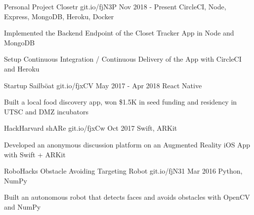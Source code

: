 \begin{cventries}
\cventry
    {Personal Project}
    {Closetr}
    {git.io/fjN3P}
    {Nov 2018 - Present}
    {CircleCI, Node, Express, MongoDB, Heroku, Docker}
    {
      \begin{cvitems}
        \item{Implemented the Backend Endpoint of the Closet Tracker App in Node and MongoDB}
        \item{Setup Continuous Integration / Continuous Delivery of the App with CircleCI and Heroku}
      \end{cvitems}
    }
\cventry
  {Startup}
  {Sailböat}
  {git.io/fjxCV}
  {May 2017 - Apr 2018}
  {React Native}
  {
    \begin{cvitems}
      \item {Built a local food discovery app, won \$1.5K in seed funding and residency in UTSC and DMZ incubators}
    \end{cvitems}
  }
\cventry
  {HackHarvard}
  {shARe}
  {git.io/fjxCw}
  {Oct 2017}
  {Swift, ARKit}
  {
    \begin{cvitems}
      \item {Developed an anonymous discussion platform on an Augmented Reality iOS App with Swift + ARKit}
    \end{cvitems}
  }
\cventry
  {RoboHacks}
  {Obstacle Avoiding Targeting Robot}
  {git.io/fjN31}
  {Mar 2016}
  {Python, NumPy}
  {
    \begin{cvitems}
      \item {Built an autonomous robot that detects faces and avoids obstacles with OpenCV and NumPy}
    \end{cvitems}
  }
\end{cventries}
